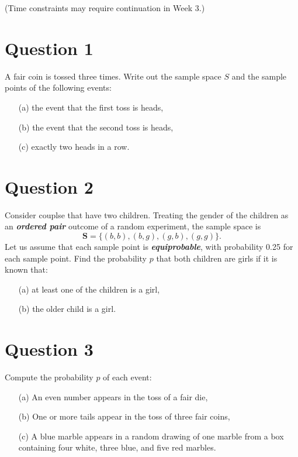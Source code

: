 \documentclass[a4paper,12pt]{article}
\begin{document}

(Time constraints may require continuation in Week 3.)
\section*{Question 1}
A fair coin is tossed three times. Write out the sample space $S$ and the sample points of the following events:
\begin{itemize}
\item[(a)] the event that the first toss is heads,
\item[(b)] the event that the second toss is heads, 
\item[(c)] exactly two heads in a row. 
\end{itemize}

\section*{Question 2}
Consider couplse that have two children. Treating the gender of the children as an \textit{\textbf{ordered pair}} outcome of a random experiment, the sample space is 
\[\boldsymbol{S} = \{ (b,b), (b,g), (g,b), (g,g)\}.\]
Let us assume that each sample point is \textit{\textbf{equiprobable}}, with probability 0.25 for each sample point.
 Find the probability $p$ that both children are girls if it is known that: 

\begin{itemize}
\item[(a)] at least one of the children is a girl,
\item[(b)] the older child is a girl. 	
\end{itemize}	

\section*{Question 3}
Compute the probability $p$ of each event:
\begin{itemize}
\item[(a)] An even number appears in the toss of a fair die,
\item[(b)] One or more tails appear in the toss of three fair coins,
\item[(c)] A blue marble appears in a random drawing of one marble from a box containing four white, three blue, and five red marbles.
\end{itemize}
\end{document}
